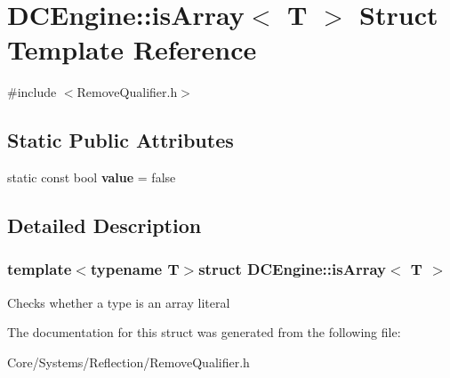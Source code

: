 \hypertarget{structDCEngine_1_1isArray}{\section{D\-C\-Engine\-:\-:is\-Array$<$ T $>$ Struct Template Reference}
\label{structDCEngine_1_1isArray}
}


{\ttfamily \#include $<$Remove\-Qualifier.\-h$>$}

\subsection*{Static Public Attributes}
\begin{DoxyCompactItemize}
\item 
\hypertarget{structDCEngine_1_1isArray_ae98b109e6040d8102f9ad534ea0758e2}{static const bool {\bfseries value} = false}\label{structDCEngine_1_1isArray_ae98b109e6040d8102f9ad534ea0758e2}

\end{DoxyCompactItemize}


\subsection{Detailed Description}
\subsubsection*{template$<$typename T$>$struct D\-C\-Engine\-::is\-Array$<$ T $>$}

Checks whether a type is an array literal 

The documentation for this struct was generated from the following file\-:\begin{DoxyCompactItemize}
\item 
Core/\-Systems/\-Reflection/Remove\-Qualifier.\-h\end{DoxyCompactItemize}
